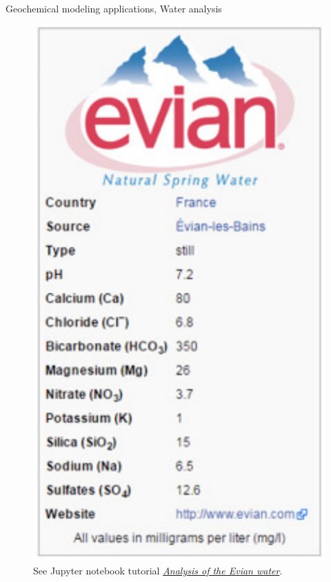 \begin{frame}{Geochemical modeling applications, Water analysis}
\begin{figure}
\includegraphics[height=0.6\textheight]{figures/applications/evian-chemical-water-composition}
\caption*{See Jupyter notebook tutorial \href{https://github.com/mtsveta/reaktoro-jupyter/blob/geofluids-examples/tutorial/eq.evian-water-analysis.ipynb}{\textcolor{indigo(dye)}{\it Analysis of the Evian water}}.}
\end{figure}
%
\ecol
%
\end{frame}

